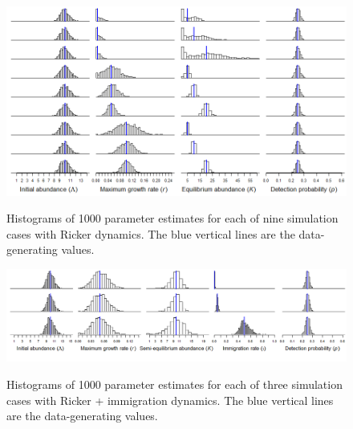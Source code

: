 \documentclass{article}
\begin{document}
\begin{landscape}
\clearpage


\begin{figure}
\caption{Histograms of 1000 parameter estimates for each of nine
simulation cases with Ricker dynamics. The blue vertical lines are the 
data-generating values.}
  \centering
  \includegraphics{../figs/rick_hists}
\label{fig:rick_hists}
\end{figure}

\begin{figure}
\caption{Histograms of 1000 parameter estimates for each of three
simulation cases with Ricker + immigration dynamics. The blue vertical lines are the 
data-generating values.}
  \centering
  \includegraphics[width=8.5in]{../figs/ricki_hists}
\label{fig:ricki_hists}
\end{figure}


\end{landscape}
\end{document}
